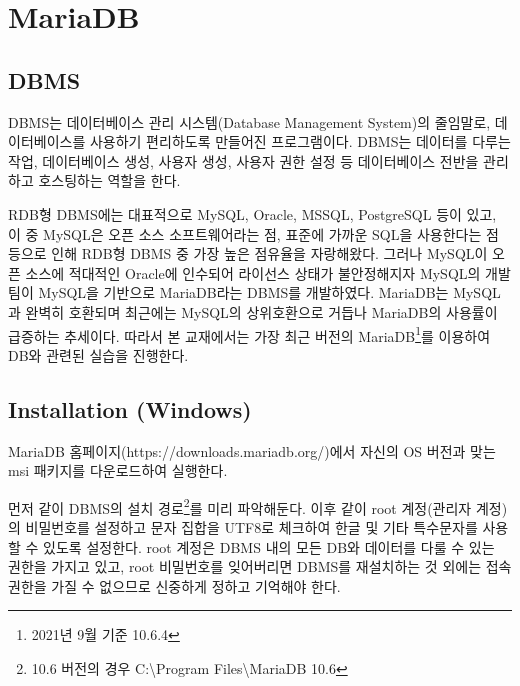\section{MariaDB}\label{sect:maria-db}

\subsection*{DBMS}

DBMS는 데이터베이스 관리 시스템(Database Management System)의 줄임말로, 데이터베이스를 사용하기 편리하도록 만들어진 프로그램이다. DBMS는 데이터를 다루는 작업, 데이터베이스 생성, 사용자 생성, 사용자 권한 설정 등 데이터베이스 전반을 관리하고 호스팅하는 역할을 한다.

RDB형 DBMS에는 대표적으로 MySQL, Oracle, MSSQL, PostgreSQL 등이 있고, 이 중 MySQL은 오픈 소스 소프트웨어라는 점, 표준에 가까운 SQL을 사용한다는 점 등으로 인해 RDB형 DBMS 중 가장 높은 점유율을 자랑해왔다. 그러나 MySQL이 오픈 소스에 적대적인 Oracle에 인수되어 라이선스 상태가 불안정해지자 MySQL의 개발팀이 MySQL을 기반으로 MariaDB라는 DBMS를 개발하였다. MariaDB는 MySQL과 완벽히 호환되며 최근에는 MySQL의 상위호환으로 거듭나 MariaDB의 사용률이 급증하는 추세이다. 따라서 본 교재에서는 가장 최근 버전의 MariaDB\footnote{2021년 9월 기준 10.6.4}를 이용하여 DB와 관련된 실습을 진행한다.

\subsection*{Installation (Windows)}

MariaDB 홈페이지(https://downloads.mariadb.org/)에서 자신의 OS 버전과 맞는 msi 패키지를 다운로드하여 실행한다.


먼저 \과 같이 DBMS의 설치 경로\footnote{10.6 버전의 경우 C:\textbackslash{}Program Files\textbackslash{}MariaDB 10.6}를 미리 파악해둔다. 이후 \와 같이 root 계정(관리자 계정)의 비밀번호를 설정하고 문자 집합을 UTF8로 체크하여 한글 및 기타 특수문자를 사용할 수 있도록 설정한다. root 계정은 DBMS 내의 모든 DB와 데이터를 다룰 수 있는 권한을 가지고 있고, root 비밀번호를 잊어버리면 DBMS를 재설치하는 것 외에는 접속 권한을 가질 수 없으므로 신중하게 정하고 기억해야 한다.

